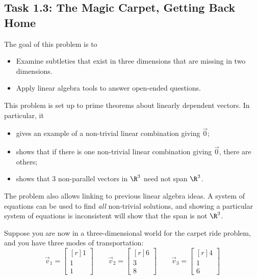 \documentclass{problemset}
\newcommand{\mat}[1]{\begin{bmatrix*}[r]#1\end{bmatrix*}}
\begin{document}
\begin{iola}
\section*{Task 1.3: The Magic Carpet, Getting Back Home}

	\begin{annotation}
		\begin{goals}

			The goal of this problem is to
			\begin{itemize}
				\item Examine subtleties that exist in three dimensions that are
					missing in two dimensions.
				\item Apply linear algebra tools to answer open-ended questions.
			\end{itemize}
		\end{goals}

		\begin{notes}
			This problem is set up to prime
			theorems about linearly dependent vectors. In particular, it
			\begin{itemize}
				\item gives an example of a non-trivial linear combination giving $\vec 0$;
				\item shows that if there is one non-trivial linear combination giving $\vec 0$,
					there are others;
				\item shows that 3 non-parallel vectors in $\R^3$ need not span $\R^3$.
			\end{itemize}

			The problem also allows linking to previous linear algebra ideas. A system
			of equations can be used to find \emph{all} non-trivial solutions, and showing
			a particular system of equations is inconsistent will show that the span
			is not $\R^3$.
		\end{notes}
	\end{annotation}
Suppose you are now in a three-dimensional world for the carpet
ride problem, and you have three modes of transportation:
\[
	\vec v_1 = \mat{1 \\1 \\ 1}\qquad
	\vec v_2 = \mat{6 \\3 \\ 8}\qquad
	\vec v_3 = \mat{4 \\1 \\ 6}
\]


\end{iola}
\end{document}
